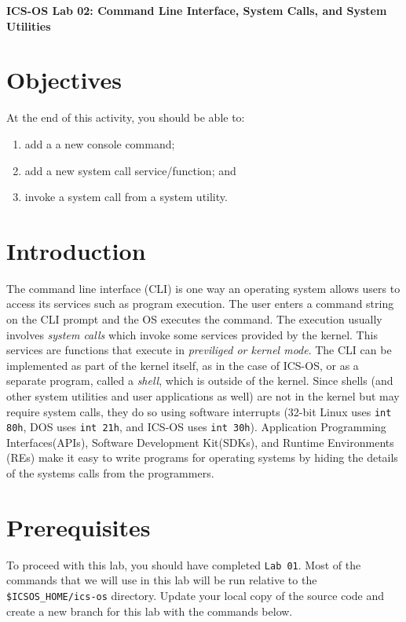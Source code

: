 \documentclass[a4paper, 11pt,oneside]{article}
\begin{document}
\begin{center}
   {\LARGE \textbf{ICS-OS Lab 02: Command Line Interface, System Calls, and System
Utilities }}
\end{center}

\section*{Objectives}
   At the end of this activity, you should be able to:
   \begin{enumerate}[itemsep=0pt,parsep=0pt]
       \item add a a new console command;
       \item add a new system call service/function; and
       \item invoke a system call from a system utility.
   \end{enumerate}   

\section{Introduction}
The command line interface (CLI) is one way an operating system allows users to
access its services such as program execution.  The user enters a command
string on the CLI prompt and the OS executes the command. The execution usually
involves \textit{system calls} which invoke some services provided by the 
kernel. This services are functions that execute in \textit{previliged or 
kernel mode}. The CLI can be implemented as part of the kernel itself, as in 
the case of ICS-OS, or as a separate program, called a \textit{shell}, which is 
outside of the kernel.  Since shells (and other system utilities and user 
applications as well) are not in the kernel but may require system calls, they 
do so using software interrupts (32-bit Linux uses \texttt{int 80h}, DOS uses 
\texttt{int 21h}, and ICS-OS uses \texttt{int 30h}). Application Programming 
Interfaces(APIs), Software Development Kit(SDKs), and Runtime Environments 
(REs) make it easy to write programs for operating systems by hiding the 
details of the systems calls from the programmers.


\section{Prerequisites}
To proceed with this lab, you should have completed \texttt{Lab 01}. Most of 
the commands that we will use in this lab will be run relative to the 
\texttt{\$ICSOS\_HOME/ics-os} directory. Update your local copy of the source 
code and create a new branch for this lab with the commands below.
\end{document}
